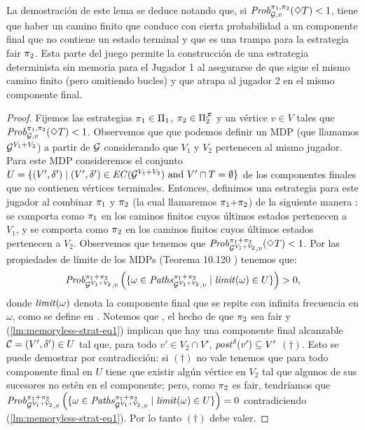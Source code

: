 La demostración de este lema se deduce notando que, si $\mathit{Prob}^{\pi_{1}, \pi_{2}}_{\mathcal{G}, v}(\Diamond T) < 1$, tiene que haber un camino finito que conduce con cierta probabilidad a un componente final que no contiene un estado terminal y que es una trampa para la estrategia fair $\pi_{2}$. Esta parte del juego permite la construcción de una estrategia determinista sin memoria para el Jugador 1 al asegurarse de que sigue el mismo camino finito (pero omitiendo bucles) y que atrapa al jugador 2 en el mismo componente final.

\begin{proof}
  Fijemos las estrategias $\pi_{1} \in \Pi_{1}$, $\pi_{2} \in
  \Pi^{\mathcal{F}}_{2}$ y un vértice $v \in V$ tales que
  $\mathit{Prob}^{\pi_{1}, \pi_{2}}_{\mathcal{G}, v}(\Diamond T) < 1$.
  Observemos que que podemos definir un MDP (que llamamos $\mathcal{G}^{V_1{+}V_2}$) a partir de
  $\mathcal{G}$ considerando que $V_1$ y $V_2$ pertenecen al mismo jugador.  Para este MDP consideremos el conjunto $U = \{ (V',\delta')
  \mid(V',\delta') \in \mathit{EC}(\mathcal{G}^{V_1{+}V_2}) \text{ and }
  V'\cap T = \emptyset \}$ de los componentes finales que no contienen vértices terminales. Entonces, definimos una estrategia para este jugador al combinar
  $\pi_{1}$ y $\pi_{2}$ (la cual llamaremos $\pi_{1}{+}\pi_{2}$) de la siguiente manera
  : se comporta como $\pi_{1}$ en los caminos finitos cuyos últimos estados pertenecen a $V_1$, y se comporta como $\pi_{2}$ en los caminos finitos cuyos últimos estados pertenecen a $V_2$. Observemos que tenemos que
  $\mathit{Prob}^{\pi_{1}{+}\pi_{2}}_{\mathcal{G}^{V_1+V_2},v}(\Diamond T) <
  1$. Por las propiedades de límite de los MDPs (Teorema 10.120 \cite{BaierK08})
  tenemos que:
  \begin{equation}\label{lm:memoryless-strat-eq1}
    \mathit{Prob}^{\pi_{1}{+}\pi_{2}}_{\mathcal{G}^{V_1+V_2},v} \left(\{ \omega \in \mathit{Paths}^{\pi_{1}{+}\pi_{2}}_{\mathcal{G}^{V_1+V_2},v} \mid \mathit{limit}(\omega)  \in U \}\right) > 0,
  \end{equation}
  donde $\mathit{limit}(\omega)$ denota la componente final que se repite con infinita frecuencia en $\omega$, como se define en \cite{BaierK08}.  Notemos que
  , el hecho de que $\pi_{2}$ sea fair y
  (\ref{lm:memoryless-strat-eq1}) implican que hay una componente final alcanzable $\mathcal{C}= (V',\delta') \in U$ tal que, para todo
  $v' \in V_2 \cap V'$, $\mathit{post}^\delta(v') \subseteq V'$ $(\dag)$.
  Esto se puede demostrar por contradicción: si $(\dag)$ no vale tenemos que para todo componente final en $U$ tiene que existir
  algún vértice en
  $V_2$ tal que algunos de sus sucesores no estén en el componente; pero,
  como $\pi_{2}$ es fair, tendríamos que
  $\mathit{Prob}^{\pi_{1}{+}\pi_{2}}_{\mathcal{G}^{V_1+V_2},v} \left ( \{ \omega \in \mathit{Paths}^{\pi_{1}{+}\pi_{2}}_{\mathcal{G}^{V_1+V_2},v} \mid \mathit{limit}(\omega) \in U \}\right) = 0$
  contradiciendo (\ref{lm:memoryless-strat-eq1}). Por lo tanto $(\dag)$ debe valer.


\end{proof}
